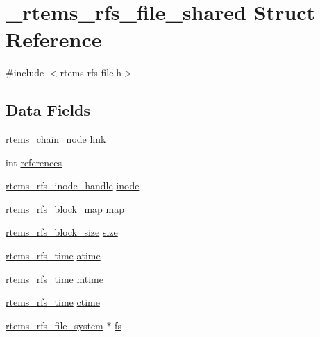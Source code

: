 \hypertarget{struct__rtems__rfs__file__shared}{}\section{\+\_\+rtems\+\_\+rfs\+\_\+file\+\_\+shared Struct Reference}
\label{struct__rtems__rfs__file__shared}


{\ttfamily \#include $<$rtems-\/rfs-\/file.\+h$>$}

\subsection*{Data Fields}
\begin{DoxyCompactItemize}
\item 
\mbox{\hyperlink{structChain__Node__struct}{rtems\+\_\+chain\+\_\+node}} \mbox{\hyperlink{struct__rtems__rfs__file__shared_ac9a589e20a44f9986e7efb45cf9db9b5}{link}}
\item 
int \mbox{\hyperlink{struct__rtems__rfs__file__shared_a7c0a1d1b43b6a47eb72ca556fc34e43f}{references}}
\item 
\mbox{\hyperlink{rtems-rfs-inode_8h_a91f02dac5a2d91e072d676f3266ab8d2}{rtems\+\_\+rfs\+\_\+inode\+\_\+handle}} \mbox{\hyperlink{struct__rtems__rfs__file__shared_a612c91853406705d5737030a7f6a157e}{inode}}
\item 
\mbox{\hyperlink{rtems-rfs-block_8h_af488270acef452a961e888bffdc3a7bf}{rtems\+\_\+rfs\+\_\+block\+\_\+map}} \mbox{\hyperlink{struct__rtems__rfs__file__shared_aad10c2e2758c7412b77b6b674b0bb1f2}{map}}
\item 
\mbox{\hyperlink{rtems-rfs-block-pos_8h_aa72438eee22908110dc633ca6b89b390}{rtems\+\_\+rfs\+\_\+block\+\_\+size}} \mbox{\hyperlink{struct__rtems__rfs__file__shared_a9e560fbf0582c82fa673e31dd9bbb49f}{size}}
\item 
\mbox{\hyperlink{rtems-rfs-inode_8h_a7877cc60240d76cccb89acaffdd20aa6}{rtems\+\_\+rfs\+\_\+time}} \mbox{\hyperlink{struct__rtems__rfs__file__shared_a9f36f49e4410534f4b9d71c24ba5e7a5}{atime}}
\item 
\mbox{\hyperlink{rtems-rfs-inode_8h_a7877cc60240d76cccb89acaffdd20aa6}{rtems\+\_\+rfs\+\_\+time}} \mbox{\hyperlink{struct__rtems__rfs__file__shared_abd80b3c44c16145f2f82c6ca5cce6f50}{mtime}}
\item 
\mbox{\hyperlink{rtems-rfs-inode_8h_a7877cc60240d76cccb89acaffdd20aa6}{rtems\+\_\+rfs\+\_\+time}} \mbox{\hyperlink{struct__rtems__rfs__file__shared_aa97064ef5014a727cbbb43ac018dd774}{ctime}}
\item 
\mbox{\hyperlink{struct__rtems__rfs__file__system}{rtems\+\_\+rfs\+\_\+file\+\_\+system}} $\ast$ \mbox{\hyperlink{struct__rtems__rfs__file__shared_a7b2dd0a580796f25377f1417deb9bf6d}{fs}}
\end{DoxyCompactItemize}


